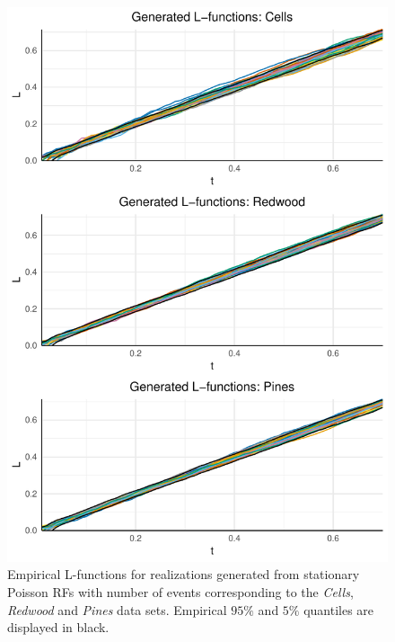 \begin{figure}
    \centering
    \includegraphics[scale=0.9]{figures/prob1_samples.pdf}
    \caption{Empirical L-functions for realizations generated from stationary Poisson RFs with number of events corresponding to the \textit{Cells}, \textit{Redwood} and \textit{Pines} data sets. Empirical $95\%$ and $5\%$ quantiles are displayed in black.}
    \label{fig:poiss_samps}
\end{figure}

